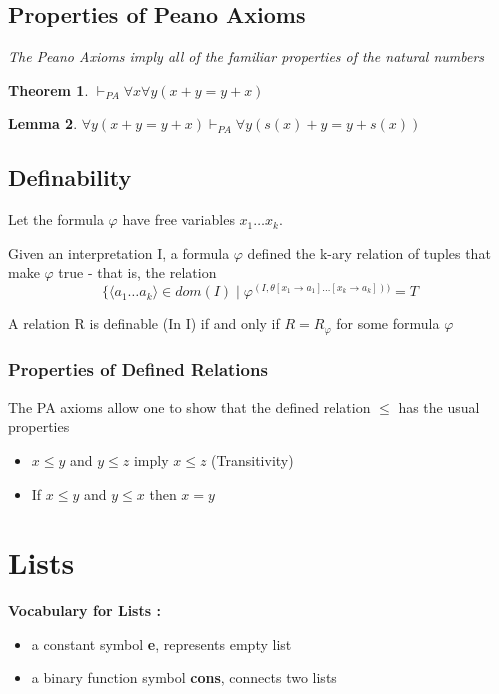 \documentclass{article}
\newcounter{lecnum}
\newtheorem{theorem}{Theorem}[lecnum]
\newtheorem{lemma}[theorem]{Lemma}
\begin{document}
\subsection{Properties of Peano Axioms}
\textit{The Peano Axioms imply all of the familiar properties of the natural numbers}

\begin{theorem} \(\vdash_{PA} \forall x \forall y ( x + y = y + x ) \)
\end{theorem}

\begin{lemma} \(\forall y (x + y = y + x) \vdash_{PA} \forall y ( s(x) + y = y + s(x))\)
\end{lemma}

\subsection{Definability}
Let the formula \(\varphi\) have free variables \(x_1 \ldots x_k\).

Given an interpretation I, a formula \(\varphi\) defined the k-ary relation of tuples that make \(\varphi\) true - that is, the relation 
$$\{ \langle a_1 \ldots a_k \rangle \in dom(I) \mid \varphi^{(I, \theta [x_1 \rightarrow a_1] \ldots [x_k \rightarrow a_k]))} = T$$

A relation R is definable (In I) if and only if \(R = R_\varphi\) for some formula \(\varphi\)

\subsubsection{Properties of Defined Relations}
The PA axioms allow one to show that the defined relation \(\leq\) has the usual properties 
\begin{itemize}
\item \(x \leq y\) and \(y \leq z\) imply \(x \leq z\) (Transitivity)
\item If \(x \leq y \) and \(y \leq x \) then \(x = y\) 
\end{itemize}

\section{Lists}

\textbf{Vocabulary for Lists :}
\begin{itemize}
\item a constant symbol \textbf{e}, represents empty list 
\item a binary function symbol \textbf{cons}, connects two lists
\end{itemize}
\end{document}
